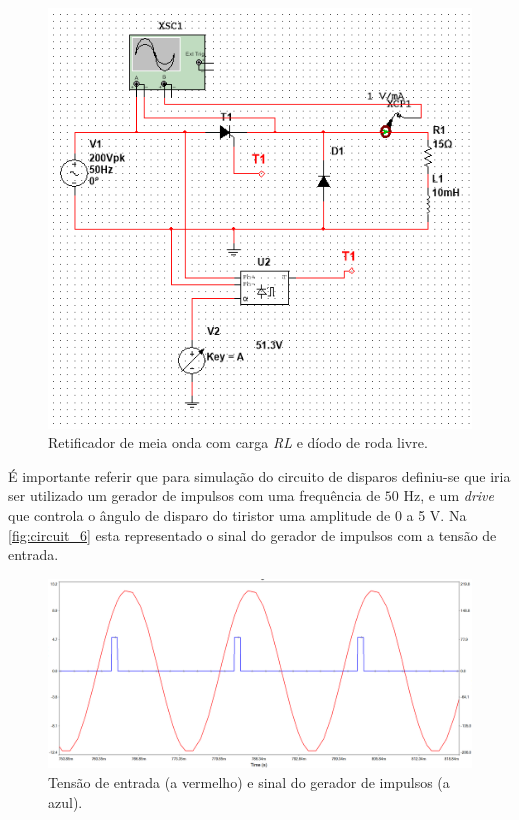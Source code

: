 \documentclass[a4paper,11pt]{article}
\numberwithin{equation}{section}
\begin{document}
\begin{figure}[h]
	\centering
	\includegraphics[keepaspectratio=true, scale=0.5]{img/circuito3}
	\caption{Retificador de meia onda com carga \textit{RL} e díodo de roda livre.}
	\label{fig:circuit_5}
	\vspace{-0.8em}
\end{figure}
\pagebreak 

É importante referir que para simulação do circuito de disparos definiu-se que iria ser utilizado um gerador de impulsos com uma frequência   de $50$ Hz, e um \textit{drive} que controla o ângulo de disparo do tiristor uma amplitude de 0 a 5 V. Na \autoref{fig:circuit_6} esta representado o sinal do gerador de impulsos com a tensão de entrada.

\begin{figure}[h]
	\centering
	\includegraphics[keepaspectratio=true, scale=0.35]{img/circuito4}
	\caption{Tensão de entrada (a vermelho) e sinal do gerador de impulsos (a azul).}
	\label{fig:circuit_6}
	\vspace{-0.8em}
\end{figure}
\end{document}
